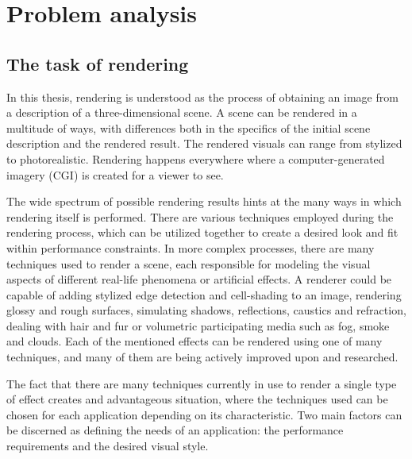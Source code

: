 \chapter{Problem analysis} %

\section{The task of rendering}

In this thesis, rendering is understood as the process of obtaining an image from a description of a three-dimensional scene. A scene can be rendered in a multitude of ways, with differences both in the specifics of the initial scene description and the rendered result. The rendered visuals can range from stylized to photorealistic. Rendering happens everywhere where a computer-generated imagery (CGI) is created for a viewer to see.

The wide spectrum of possible rendering results hints at the many ways in which rendering itself is performed. There are various techniques employed during the rendering process, which can be utilized together to create a desired look and fit within performance constraints. In more complex processes, there are many techniques used to render a scene, each responsible for modeling the visual aspects of different real-life phenomena or artificial effects. A renderer could be capable of adding stylized edge detection and cell-shading to an image, rendering glossy and rough surfaces, simulating shadows, reflections, caustics and refraction, dealing with hair and fur or volumetric participating media such as fog, smoke and clouds. Each of the mentioned effects can be rendered using one of many techniques, and many of them are being actively improved upon and researched.

The fact that there are many techniques currently in use to render a single type of effect creates and advantageous situation, where the techniques used can be chosen for each application depending on its characteristic. Two main factors can be discerned as defining the needs of an application: the performance requirements and the desired visual style.

